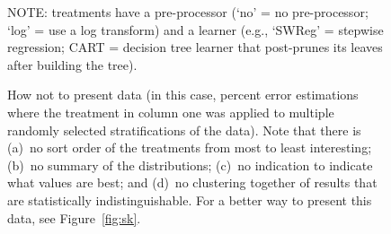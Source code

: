 \documentclass[10pt]{elsarticle}
\begin{document}
\begin{figure}[!t]
\begin{raggedright}\small{NOTE: treatments have a pre-processor (`no' =  no pre-processor; `log' = use a log transform) and a learner (e.g., `SWReg' = stepwise regression; CART =  decision tree learner that post-prunes its leaves after building the tree).}
\end{raggedright}


\caption{How not to present data (in this case, percent error estimations where the treatment in column one was applied to multiple randomly selected stratifications of the data). Note that there is (a)~no sort order of the treatments from most to least interesting;  (b)~no summary of the distributions; (c)~no indication  to indicate what values are best; and  (d)~no clustering together of results that are statistically indistinguishable. For a better way
to present this data, see Figure~\ref{fig:sk}. }\label{bad}
\end{figure}
\end{document}
